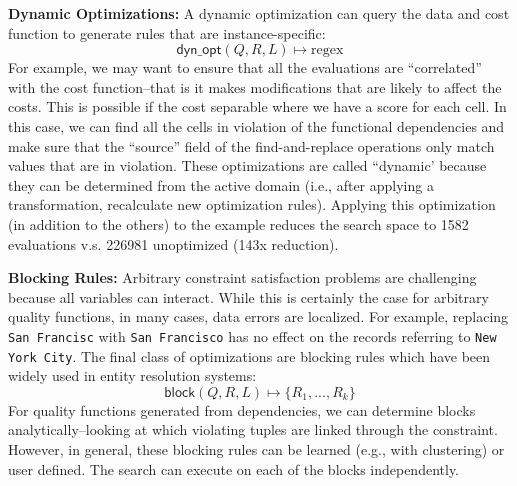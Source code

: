 \vspace{0.5em}\noindent\textbf{Dynamic Optimizations: } A dynamic optimization can query the data and cost function to generate rules that are instance-specific:
\[\textsf{dyn\_opt}(Q, R, L) \mapsto \text{regex}\]
For example, we may want to ensure that all the evaluations are ``correlated'' with the cost function--that is it makes modifications that are likely to affect the costs.
This is possible if the cost separable where we have a score for each cell. In this case, we can find all the cells in violation of the functional dependencies and make sure that the ``source'' field of the find-and-replace operations only match values that are in violation.
These optimizations are called ``dynamic' because they can be determined from the active domain (i.e., after applying a transformation, recalculate new optimization rules).
Applying this optimization (in addition to the others) to the example reduces the search space to 1582 evaluations v.s. 226981 unoptimized (143x reduction).

\vspace{0.5em}\noindent\textbf{Blocking Rules: }  Arbitrary constraint satisfaction problems are challenging because all variables can interact. While this is certainly the case for arbitrary quality functions, in many cases, data errors are localized. For example, replacing \texttt{San Francisc} with \texttt{San Francisco} has no effect on the records referring to \texttt{New York City}. The final class of optimizations are blocking rules which have been widely used in entity resolution systems:
\[\textsf{block}(Q, R, L) \mapsto \{R_1,...,R_k\} \]
For quality functions generated from dependencies, we can determine blocks analytically--looking at which violating tuples are linked through the constraint.
However, in general, these blocking rules can be learned (e.g., with clustering) or user defined.
The search can execute on each of the blocks independently.

